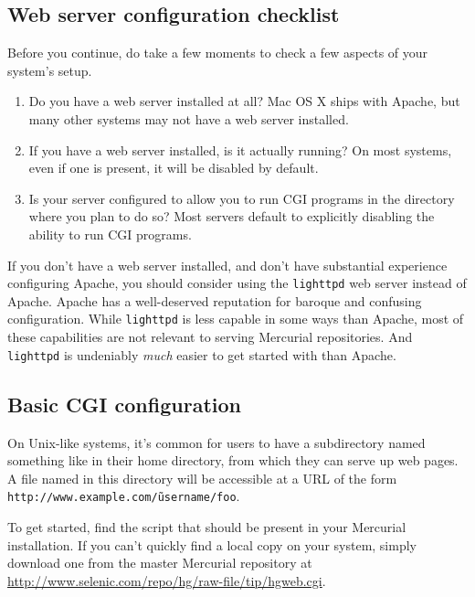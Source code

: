 \subsection{Web server configuration checklist}

Before you continue, do take a few moments to check a few aspects of
your system's setup.

\begin{enumerate}
\item Do you have a web server installed at all?  Mac OS X ships with
  Apache, but many other systems may not have a web server installed.
\item If you have a web server installed, is it actually running?  On
  most systems, even if one is present, it will be disabled by
  default.
\item Is your server configured to allow you to run CGI programs in
  the directory where you plan to do so?  Most servers default to
  explicitly disabling the ability to run CGI programs.
\end{enumerate}

If you don't have a web server installed, and don't have substantial
experience configuring Apache, you should consider using the
\texttt{lighttpd} web server instead of Apache.  Apache has a
well-deserved reputation for baroque and confusing configuration.
While \texttt{lighttpd} is less capable in some ways than Apache, most
of these capabilities are not relevant to serving Mercurial
repositories.  And \texttt{lighttpd} is undeniably \emph{much} easier
to get started with than Apache.

\subsection{Basic CGI configuration}

On Unix-like systems, it's common for users to have a subdirectory
named something like  in their home directory,
from which they can serve up web pages.  A file named 
in this directory will be accessible at a URL of the form
\texttt{http://www.example.com/\~username/foo}.

To get started, find the  script that should be
present in your Mercurial installation.  If you can't quickly find a
local copy on your system, simply download one from the master
Mercurial repository at
\url{http://www.selenic.com/repo/hg/raw-file/tip/hgweb.cgi}.

